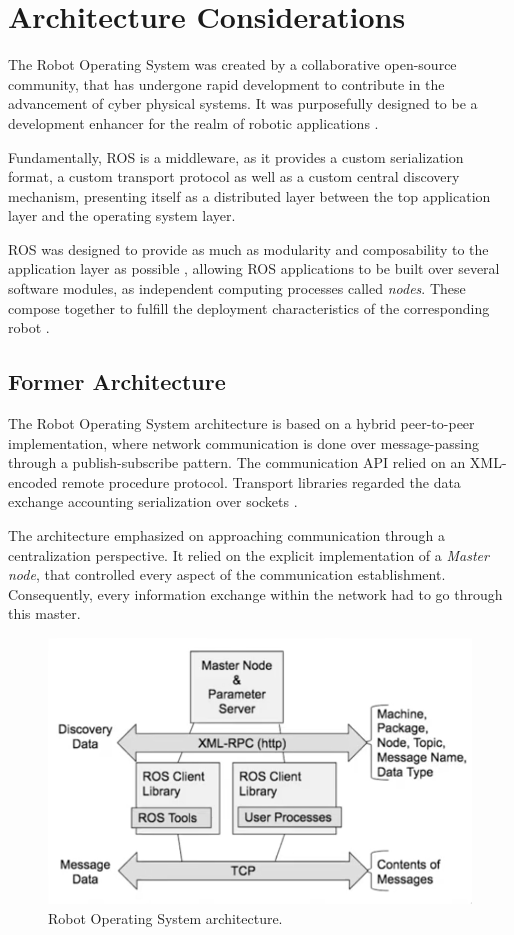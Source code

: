 \section{Architecture Considerations}

The Robot Operating System was created by a collaborative open-source community, that has undergone rapid development \cite{cousins2011exponential} to contribute in the advancement of cyber physical systems. It was purposefully designed to be a development enhancer for the realm of robotic applications \cite{diluoffo2018robot, intro-ros}.

Fundamentally, ROS is a middleware, as it provides a custom serialization format, a custom transport protocol as well as a custom central discovery mechanism, presenting itself as a distributed layer between the top application layer and the operating system layer. 

ROS was designed to provide as much as modularity and composability to the application layer as possible \cite{casini2019response}, allowing ROS applications to be built over several software modules, as independent computing processes called \textit{nodes}. These compose together to fulfill the deployment characteristics of the corresponding robot \cite{maruyama2016exploring}.

\subsection{Former Architecture}

The Robot Operating System architecture is based on a hybrid peer-to-peer implementation, where network communication is done over message-passing through a publish-subscribe pattern. The communication API relied on an XML-encoded remote procedure protocol. Transport libraries regarded the data exchange accounting serialization over sockets \cite{white2016sros}.

The architecture emphasized on approaching communication through a centralization perspective. It relied on the explicit implementation of a \textit{Master node}, that controlled every aspect of the communication establishment. Consequently, every information exchange within the network had to go through this master.


\begin{figure}[H]
  \centering
  \includegraphics[width=0.6\linewidth]{images/former-ros1-architecture.png}
  \caption{Robot Operating System architecture.}
  \label{fig:ros1-architecture}
\end{figure}


